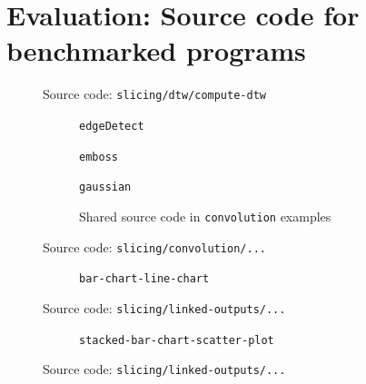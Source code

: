 \section{Evaluation: Source code for benchmarked programs}

\begin{figure}[H]
   \small
   {}
   \caption{Source code: \lstinline{slicing/dtw/compute-dtw}}
\end{figure}

\begin{figure}
  \begin{subfigure}[position]{1\textwidth}
    \small
    {}
    \caption{\lstinline{edgeDetect}}
  \end{subfigure}
  \begin{subfigure}[position]{1\textwidth}
    \small
    {}
    \caption{\lstinline{emboss}}
  \end{subfigure}
  \begin{subfigure}[position]{1\textwidth}
    \small
    {}
    \caption{\lstinline{gaussian}}
  \end{subfigure}
  \begin{subfigure}[position]{\textwidth}
    \small
    {}
    \caption{Shared source code in \lstinline{convolution} examples}
  \end{subfigure}
  \caption{Source code: \lstinline{slicing/convolution/...}}
\end{figure}

\begin{figure}
  \begin{subfigure}[position]{1\textwidth}
    \small
    {}
    \caption{\lstinline{bar-chart-line-chart}}
  \end{subfigure}
  \caption{Source code: \lstinline{slicing/linked-outputs/...}}
\end{figure}
\begin{figure}\ContinuedFloat
  \begin{subfigure}[position]{1\textwidth}
    \small
    {}
    \caption{\lstinline{stacked-bar-chart-scatter-plot}}
  \end{subfigure}
  \caption{Source code: \lstinline{slicing/linked-outputs/...}}
\end{figure}

